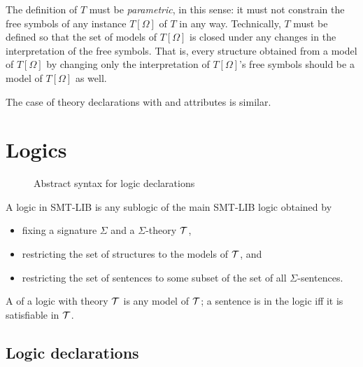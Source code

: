 The definition of $T$ must be \emph{parametric}, in this sense: 
it must not constrain the free symbols of 
any instance $T[\Omega]$ of $T$ in any way.
Technically, $T$ must be defined so that
the set of models of $T[\Omega]$ is closed 
under any changes in the interpretation of the free symbols.
That is,
every structure obtained from a model of $T[\Omega]$
by changing only the interpretation of $T[\Omega]$'s free symbols should be 
a model of $T[\Omega]$ as well.


The case of theory declarations with  and
 attributes is similar.


\section{Logics} \label{sec:logics}

\begin{figure}[t]
\logics
\caption{Abstract syntax for logic declarations}
\label{fig:logic-declaration}
\end{figure}


A logic in SMT-LIB is any sublogic of the main SMT-LIB logic obtained by 
\begin{itemize}
\item
fixing a signature $\Sigma$ and a $\Sigma$-theory $\mathcal{T}$,

\item
restricting the set of structures to the models of $\mathcal{T}$,
and 

\item
restricting the set of sentences to some subset of 
the set of all $\Sigma$-sentences.
\end{itemize}

A  of a logic with theory $\mathcal{T}$ is any model of $\mathcal{T}$;
a sentence is  in the logic iff it is satisfiable in $\mathcal{T}$.



\subsection{Logic declarations} \label{sec:logic-decl}


